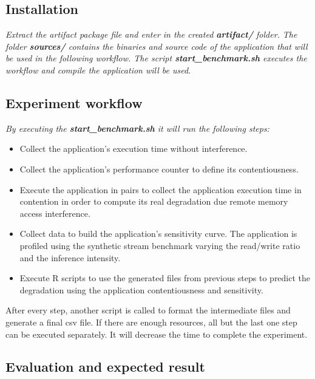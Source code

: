 \documentclass{sigplanconf}
\begin{document}
{%
\subsection{Installation}

{\em Extract the artifact package file and enter in the created {\bf artifact/} folder. The folder {\bf sources/} contains the binaries and source code of the application that will be used in the following workflow. The script {\bf start\_benchmark.sh} executes the workflow and compile the application will be used.  }

\subsection{Experiment workflow}

{\em By executing the {\bf start\_benchmark.sh} it will run the following steps: 
\begin{itemize}
	\item Collect the application's execution time without interference.
	\item Collect the application's performance counter to define its contentiousness.
	\item Execute the application in pairs to collect the application execution time in contention in order to compute its real degradation due remote memory access interference.
	\item Collect data to build the application's sensitivity curve. The application is profiled using the synthetic stream benchmark varying the read/write ratio and the inference intensity.
	\item Execute R scripts to use the generated files from previous steps to predict the degradation using the application contentiousness and sensitivity.
\end{itemize}
After every step, another script is called to format the intermediate files and generate a final csv file. If there are enough resources, all but the last one step can be executed separately. It will decrease the time to complete the experiment.
}

\subsection{Evaluation and expected result}

}
\end{document}
